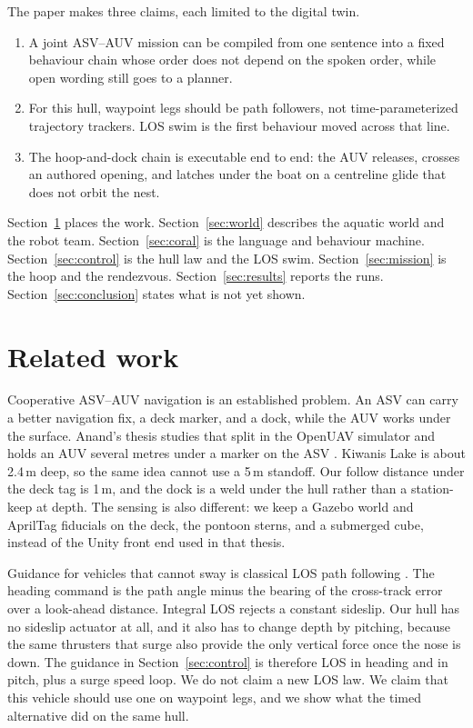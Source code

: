 \documentclass[conference]{IEEEtran}
\begin{document}
The paper makes three claims, each limited to the digital twin.
\begin{enumerate}
\item A joint ASV--AUV mission can be compiled from one sentence into a fixed behaviour chain whose order does not depend on the spoken order, while open wording still goes to a planner.
\item For this hull, waypoint legs should be path followers, not time-parameterized trajectory trackers. LOS swim is the first behaviour moved across that line.
\item The hoop-and-dock chain is executable end to end: the AUV releases, crosses an authored opening, and latches under the boat on a centreline glide that does not orbit the nest.
\end{enumerate}

Section~\ref{sec:related} places the work. Section~\ref{sec:world} describes the aquatic world and the robot team. Section~\ref{sec:coral} is the language and behaviour machine. Section~\ref{sec:control} is the hull law and the LOS swim. Section~\ref{sec:mission} is the hoop and the rendezvous. Section~\ref{sec:results} reports the runs. Section~\ref{sec:conclusion} states what is not yet shown.

\section{Related work}
\label{sec:related}

Cooperative ASV--AUV navigation is an established problem. An ASV can carry a better navigation fix, a deck marker, and a dock, while the AUV works under the surface. Anand's thesis studies that split in the OpenUAV simulator and holds an AUV several metres under a marker on the ASV \cite{anand2020}. Kiwanis Lake is about 2.4\,m deep, so the same idea cannot use a 5\,m standoff. Our follow distance under the deck tag is 1\,m, and the dock is a weld under the hull rather than a station-keep at depth. The sensing is also different: we keep a Gazebo world and AprilTag fiducials \cite{olson2011} on the deck, the pontoon sterns, and a submerged cube, instead of the Unity front end used in that thesis.

Guidance for vehicles that cannot sway is classical LOS path following \cite{fossen2011,lekkas2014}. The heading command is the path angle minus the bearing of the cross-track error over a look-ahead distance. Integral LOS rejects a constant sideslip. Our hull has no sideslip actuator at all, and it also has to change depth by pitching, because the same thrusters that surge also provide the only vertical force once the nose is down. The guidance in Section~\ref{sec:control} is therefore LOS in heading and in pitch, plus a surge speed loop. We do not claim a new LOS law. We claim that this vehicle should use one on waypoint legs, and we show what the timed alternative did on the same hull.
\end{document}
